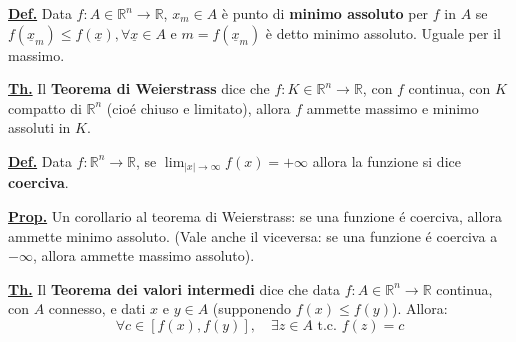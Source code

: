 \documentclass[a4paper,10pt]{article} %
\renewcommand{\b}[1]{%
    {\textbf{#1}}}
\renewcommand{\v}[1]{%
    {\underline{#1}}}
\newcommand{\ldef}[1]{%
    {\smallbreak\par\tiny\textbf{\underline{Def.}} {#1} \smallbreak}}
\newcommand{\lprop}[1]{%
    {\smallbreak\par\tiny\textbf{\underline{Prop.}} {#1} \smallbreak}}
\newcommand{\ltheorem}[1]{%
    {\smallbreak\par\tiny\textbf{\underline{Th.}} {#1} \smallbreak\par}}
\newcommand{\ldim}[1]{%
    {\smallbreak\par\tiny\emph{\textbf{Dimostrazione}} {#1} \par}}
\renewcommand{\ldim}[1]{{}}
\begin{document}
\begin{multicols}{6}
\ldef{
    Data $f:A\in\mathbb{R}^n\rightarrow\mathbb{R}$, $x_m \in A$ è punto di
    \b{minimo assoluto} per $f$ in $A$ se $f(\v{x}_m) \leq f(\v{x}), \forall
    \v{x} \in A$ e $m = f(\v{x}_m)$ è detto minimo assoluto. Uguale per il
    massimo.
}


\ltheorem{
    Il \b{Teorema di Weierstrass} dice che $f:K \in \mathbb{R}^n \rightarrow
    \mathbb{R}$, con $f$ continua, con $K$ compatto di $\mathbb{R}^n$ 
    (cio\'e chiuso e limitato), allora $f$ ammette massimo e minimo 
    assoluti in $K$.
    \ldim{
        L'idea della dimostrazione \'e di usare la stessa dimostrazione
        di Weierstrass in $\mathbb{R}^1$, estendendola a pi\'u dimensioni.
        Infatti, il teorema di Bolzano Weierstrass funziona anche con
        successioni in $\mathbb{R}^n$
    }
}

\ldef{
    Data $f:\mathbb{R}^n\rightarrow\mathbb{R}$, se 
    $\displaystyle \lim_{|x| \rightarrow \infty} f(x) = + \infty$
    allora la funzione si dice \b{coerciva}.
}

\lprop{
    Un corollario al teorema di Weierstrass: se una funzione \'e coerciva,
    allora ammette minimo assoluto. (Vale anche il viceversa: se una
    funzione \'e coerciva a $ - \infty$, allora ammette massimo assoluto).
    \ldim{
        \[
            \forall N > 0, \exists R_N > 0, \text{ t.c. } f(x) > N, \quad 
            \forall x \text{ t.c. } |x| > R_N
        \]
        Consideriamo $f(\v{0}) = N$. 
        Per questo $N$, sia
        $\displaystyle \min_{B_{R_N}(0)} f = f(x_0)$ per Weierstrass.
        L'insieme $k = \{|\v{x}| \leq R_N\}$ \'e compatto. Quindi,
        \begin{gather*}
            f(x) > N = f(0) \geq f(x_0), \quad \forall x \in \mathbb{R}^n
            \backslash B_{R_N} (0) \\
            f(x) \geq f(x_0), \quad \forall x \in B_{R_N}(0) \\
            f(x) \geq f(x_0), \quad \forall x \in \mathbb{R}^n \implies
            x_0 \text{ \'e punto di min assoluto}
        \end{gather*} 
    }
}

\ltheorem{
    Il \b{Teorema dei valori intermedi} dice che data
    $f:A\in\mathbb{R}^n\rightarrow\mathbb{R}$ continua, con $A$ connesso,
    e dati $x$ e $y \in A$ (supponendo $f(x) \leq f(y)$). Allora:
    \[
        \forall c \in [f(x), f(y)], \quad \exists z\in A \text{ t.c. } f(z)=c
    \]
    \ldim{
        $\exists \varnothing: [0, 1] \rightarrow A$ continua t.c.  $
        \varnothing(0) = x, \varnothing(1)=y$\\
        Definiamo $g:[0,1] \rightarrow \mathbb{R}$, come $t \rightarrow
        f(\varnothing(t))$, continua per comp. di funzioni continue.
        Applico il teorema dei valori intermedi a $g$:
        \[
            \text{Dato } c \in [g(0), g(1)], \; \exists \theta \in [0, 1] 
            \text{ t.c. } g(\theta) = c
        \]
        Ma allora $f(\varnothing(\theta)) = c$ e vale la tesi con 
        $z = \varnothing(\theta)$
    }
}


\end{multicols}
\end{document}
